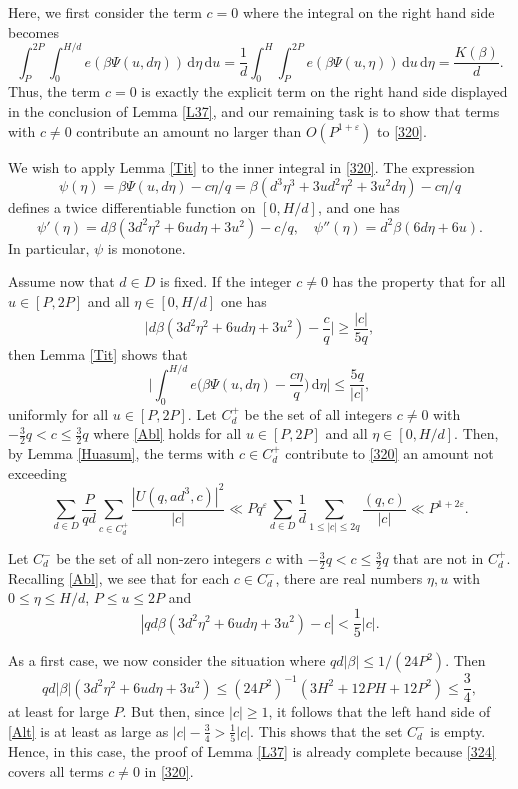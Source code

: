 \documentclass[reqno]{amsart}
\newcommand{\f}[2]{\frac{#1}{#2}}
\newcommand\dd{{\mathrm d}}
\newcommand\ts{\textstyle}
\numberwithin{equation}{section}
\begin{document}
Here, we first consider the term $c=0$ where the integral on the right hand side becomes
$$ \int_P^{2P}\!\!\!\int_0^{H/d}
e(\beta\Psi(u,d\eta))\,\dd \eta\,\dd u = \f1{d} \int_0^H\!\!\!\int_P^{2P}
e(\beta\Psi(u,\eta))\,\dd u\,\dd \eta = \f{K(\beta)}{d}. $$
Thus, the term $c=0$ is exactly the explicit term on the right hand side displayed in the conclusion of Lemma \ref{L37}, and our remaining task is 
to show that terms with $c\neq 0$ contribute an amount no larger than $O(P^{1+\varepsilon})$ to \eqref{320}. 

We wish to apply Lemma \ref{Tit} to the inner integral in  \eqref{320}. The expression
$$ \psi(\eta) = \beta \Psi(u,d\eta) - c\eta/q = \beta(d^3\eta^3 + 3ud^2\eta^2 +3u^2d\eta) - c\eta/q$$
defines a twice differentiable function on $[0,H/d]$, and one has
$$ \psi'(\eta) = d\beta(3d^2\eta^2 + 6ud\eta + 3u^2) - c/q, \quad \psi''(\eta) = d^2\beta (6d\eta +6u). $$
In particular, $\psi$ is monotone. 

Assume now that $d\in D$ is fixed. If the integer $c\neq 0$ has the property that for all $u\in[P,2P]$ and all $\eta\in[0,H/d]$ one has
\begin{equation}\label{Abl}\Big| d\beta(3d^2\eta^2 + 6ud\eta + 3u^2) - \f{c}{q}\Big| \ge \f{|c|}{5q}, \end{equation}
then Lemma \ref{Tit} shows that
$$\Big| \int_0^{H/d} e\Big(\beta \Psi(u, d\eta) - \frac{c\eta}{q}\Big)\, \mathrm d \eta\Big| \le \f{5q}{|c|}, $$ 
uniformly for all $u\in [P,2P]$. Let $C_d^+$ be the set of all integers $c\neq 0$ with $-\f32 q< c\le \f32 q$ where \eqref{Abl} holds for all $u\in [P,2P]$ and all $\eta\in [0,H/d]$. Then, by Lemma \ref{Huasum}, the terms with $c\in C_d^+$ contribute to \eqref{320} an amount not exceeding
\begin{equation}\label{324} \sum_{d\in D} \f{P}{qd} \sum_{c\in C_d^+}\f{|U(q,ad^3,c)|^2}{|c|}
\ll Pq^\varepsilon \sum_{d\in D} \frac1{d} \sum_{1\le |c|\le 2q} \f{(q,c)}{|c|} \ll P^{1+2\varepsilon}. \end{equation} 

Let $C_d^-$ be the set of all non-zero integers $c$ with $-\f32 q<c\le \f32 q$ that are not in $C_d^+$. 
Recalling \eqref{Abl}, we see that for each $c\in C_d^-$, there are real numbers $\eta, u$ with $0\le \eta\le H/d$, $P\le u\le 2P$ and
\begin{equation}\label{Alt} |qd\beta (3d^2\eta^2 + 6ud\eta + 3u^2) - c| < \ts\f15 |c|. \end{equation}

As a first case, we now consider the situation where $qd|\beta| \le 1/(24P^2)$. Then
$$ qd|\beta| (3d^2\eta^2 + 6ud\eta + 3u^2)\le (24P^2)^{-1}(3H^2+12PH+12P^2) \le \ts\f34, $$
at least for large $P$. But then, since $|c|\ge 1$, it follows that the left hand side of \eqref{Alt} is at least as large as $|c|-\f34 > \f15|c|$. This shows that the set $C_d^-$ is empty. Hence, in this case, the proof of Lemma \ref{L37} is already complete because \eqref{324} covers all terms $c\neq 0$ in \eqref{320}.
\end{document}
